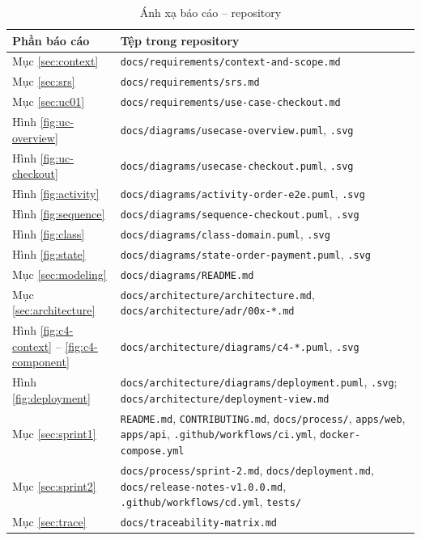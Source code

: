 \documentclass[a4paper]{article}
\newcommand{\code}[1]{\texttt{#1}}
\newcommand{\thead}{\rowcolor{headgray}}
\begin{document}
\begin{table}[H]
\centering
\caption{Ánh xạ báo cáo -- repository}
\begin{tabularx}{\textwidth}{|l|X|}
\hline
\thead \textbf{Phần báo cáo} & \textbf{Tệp trong repository} \\ \hline
Mục \ref{sec:context} & \code{docs/requirements/context-and-scope.md} \\ \hline
Mục \ref{sec:srs} & \code{docs/requirements/srs.md} \\ \hline
Mục \ref{sec:uc01} & \code{docs/requirements/use-case-checkout.md} \\ \hline
Hình \ref{fig:uc-overview} & \code{docs/diagrams/usecase-overview.puml}, \code{.svg} \\ \hline
Hình \ref{fig:uc-checkout} & \code{docs/diagrams/usecase-checkout.puml}, \code{.svg} \\ \hline
Hình \ref{fig:activity} & \code{docs/diagrams/activity-order-e2e.puml}, \code{.svg} \\ \hline
Hình \ref{fig:sequence} & \code{docs/diagrams/sequence-checkout.puml}, \code{.svg} \\ \hline
Hình \ref{fig:class} & \code{docs/diagrams/class-domain.puml}, \code{.svg} \\ \hline
Hình \ref{fig:state} & \code{docs/diagrams/state-order-payment.puml}, \code{.svg} \\ \hline
Mục \ref{sec:modeling} & \code{docs/diagrams/README.md} \\ \hline
Mục \ref{sec:architecture} & \code{docs/architecture/architecture.md}, \code{docs/architecture/adr/00x-*.md} \\ \hline
Hình \ref{fig:c4-context} -- \ref{fig:c4-component} & \code{docs/architecture/diagrams/c4-*.puml}, \code{.svg} \\ \hline
Hình \ref{fig:deployment} & \code{docs/architecture/diagrams/deployment.puml}, \code{.svg}; \code{docs/architecture/deployment-view.md} \\ \hline
Mục \ref{sec:sprint1} & \code{README.md}, \code{CONTRIBUTING.md}, \code{docs/process/}, \code{apps/web}, \code{apps/api}, \code{.github/workflows/ci.yml}, \code{docker-compose.yml} \\ \hline
Mục \ref{sec:sprint2} & \code{docs/process/sprint-2.md}, \code{docs/deployment.md}, \code{docs/release-notes-v1.0.0.md}, \code{.github/workflows/cd.yml}, \code{tests/} \\ \hline
Mục \ref{sec:trace} & \code{docs/traceability-matrix.md} \\ \hline
\end{tabularx}
\end{table}
\end{document}
